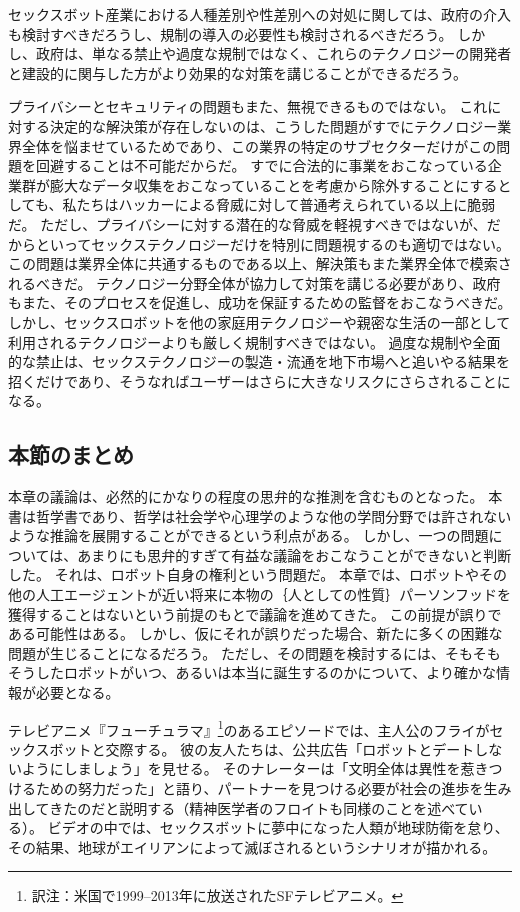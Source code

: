 \documentclass[paper=a4,book,openany]{jlreq}
\begin{document}
セックスボット産業における人種差別や性差別への対処に関しては、政府の介入も検討すべきだろうし、規制の導入の必要性も検討されるべきだろう。
しかし、政府は、単なる禁止や過度な規制ではなく、これらのテクノロジーの開発者と建設的に関与した方がより効果的な対策を講じることができるだろう。

プライバシーとセキュリティの問題もまた、無視できるものではない。
これに対する決定的な解決策が存在しないのは、こうした問題がすでにテクノロジー業界全体を悩ませているためであり、この業界の特定のサブセクターだけがこの問題を回避することは不可能だからだ。
すでに合法的に事業をおこなっている企業群が膨大なデータ収集をおこなっていることを考慮から除外することにするとしても、私たちはハッカーによる脅威に対して普通考えられている以上に脆弱だ。
ただし、プライバシーに対する潜在的な脅威を軽視すべきではないが、だからといってセックステクノロジーだけを特別に問題視するのも適切ではない。
この問題は業界全体に共通するものである以上、解決策もまた業界全体で模索されるべきだ。
テクノロジー分野全体が協力して対策を講じる必要があり、政府もまた、そのプロセスを促進し、成功を保証するための監督をおこなうべきだ。
しかし、セックスロボットを他の家庭用テクノロジーや親密な生活の一部として利用されるテクノロジーよりも厳しく規制すべきではない。
過度な規制や全面的な禁止は、セックステクノロジーの製造・流通を地下市場へと追いやる結果を招くだけであり、そうなればユーザーはさらに大きなリスクにさらされることになる。

\subsection{本節のまとめ}

本章の議論は、必然的にかなりの程度の思弁的な推測を含むものとなった。
本書は哲学書であり、哲学は社会学や心理学のような他の学問分野では許されないような推論を展開することができるという利点がある。
しかし、一つの問題については、あまりにも思弁的すぎて有益な議論をおこなうことができないと判断した。
それは、ロボット自身の権利という問題だ。
本章では、ロボットやその他の人工エージェントが近い将来に本物の｛人としての性質｝{パーソンフッド}を獲得することはないという前提のもとで議論を進めてきた。
この前提が誤りである可能性はある。
しかし、仮にそれが誤りだった場合、新たに多くの困難な問題が生じることになるだろう。
ただし、その問題を検討するには、そもそもそうしたロボットがいつ、あるいは本当に誕生するのかについて、より確かな情報が必要となる。

テレビアニメ『フューチュラマ』\footnote{訳注：米国で1999--2013年に放送されたSFテレビアニメ。}のあるエピソードでは、主人公のフライがセックスボットと交際する。
彼の友人たちは、公共広告「ロボットとデートしないようにしましょう」を見せる。
そのナレーターは「文明全体は異性を惹きつけるための努力だった」と語り、パートナーを見つける必要が社会の進歩を生み出してきたのだと説明する（精神医学者のフロイトも同様のことを述べている）。
ビデオの中では、セックスボットに夢中になった人類が地球防衛を怠り、その結果、地球がエイリアンによって滅ぼされるというシナリオが描かれる。
\end{document}
